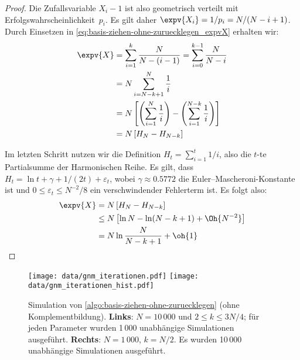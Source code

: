 \begin{proof}
    Die Zufallsvariable $X_i - 1$ ist also geometrisch verteilt mit Erfolgswahrscheinlichkeit~$p_i$.
    Es gilt daher $\expv{X_i} = 1 / p_i = N / (N - i + 1)$. Durch Einsetzen in \cref{eq:basis-ziehen-ohne-zuruecklegen_expvX} erhalten wir:
    \vspace{-2ex}
    \begin{align}
        \expv{X} & = \sum_{i=1}^k \frac{N}{N-(i-1)} = \sum_{i=0}^{k-1} \frac{N}{N - i}                                      \\
                 & = N \sum_{i=N-k+1}^N \frac{1}{i}                                                                         \\
                 & = N \left[ \left( \sum_{i=1}^N \frac{1}{i} \right) - \left( \sum_{i=1}^{N-k} \frac{1}{i} \right) \right] \\
                 & = N \left[ H_N - H_{N-k} \right]
    \end{align}

    Im letzten Schritt nutzen wir die Definition $H_t = \sum_{i=1}^t 1/i$, also die $t$-te Partialsumme der Harmonischen Reihe.
    Es gilt, dass $H_t = \ln t + \gamma + 1/(2t) + \varepsilon_t$, wobei $\gamma \approx 0.5772$ die Euler–Mascheroni-Konstante ist und $0 \le \varepsilon_t \le N^{-2}/8$ ein verschwindender Fehlerterm ist.
    Es folgt also:
    \begin{align}
        \expv{X} & = N \left[ H_N - H_{N-k} \right]                      \\
& \le N \left[ \ln N - \ln (N - k + 1) + \Oh{N^{-2}} \right]  \\
& = N \ln \frac{N}{N - k + 1} + \oh{1}
    \end{align}
\end{proof}

\noindent
\begin{figure}
    \begin{center}
        \texttt{[image: data/gnm\_iterationen.pdf]}%
        \hfil
        \texttt{[image: data/gnm\_iterationen\_hist.pdf]}
    \end{center}
    \caption{Simulation von \cref{algo:basis-ziehen-ohne-zuruecklegen} (ohne Komplementbildung).
        \textbf{Links}: $N=10\,000$ und $2 \le k \le 3N/4$; für jeden Parameter wurden 1\,000 unabhängige Simulationen ausgeführt.
        \textbf{Rechts}: $N=1\,000$, $k = N/2$. Es wurden 10\,000 unabhängige Simulationen ausgeführt.
    }
    \label{fig:ziehen-ohne-zuruecklegen-iterationen}
\end{figure}

